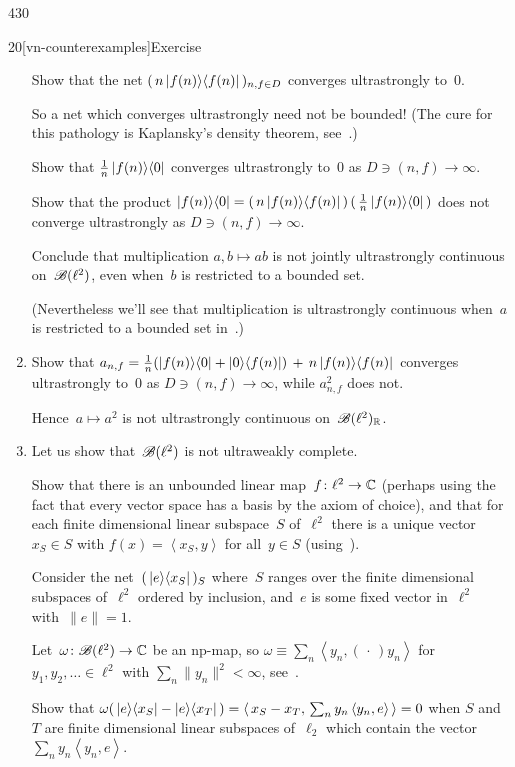 \begin{parsec}{430}
\begin{point}{20}[vn-counterexamples]{Exercise}
\begin{enumerate}
Show that the net $(\, n\ketbra{f(n)}{f(n)}\,)_{n,f\in D}$
converges ultrastrongly to~$0$.

So a net which converges ultrastrongly need not be bounded!
(The cure for this pathology is Kaplansky's density theorem, 
see~.)

Show that $\frac{1}{n} \ketbra{f(n)}{0}$
converges ultrastrongly to~$0$ as $D\ni(n,f)\to \infty$.

Show that the product
$\ketbra{f(n)}{0} = (\,n\ketbra{f(n)}{f(n)}\,)\,(\,\frac{1}{n}
\ketbra{f(n)}{0}\,)$
does not converge ultrastrongly 
as $D\ni(n,f)\to\infty$.

Conclude that multiplication $a,b\mapsto ab$
is not jointly ultrastrongly continuous on~$\scrB(\ell^2)$,
even when~$b$ is restricted to a bounded set.

(Nevertheless we'll see that multiplication is ultrastrongly continuous
when~$a$ is restricted to a bounded set in~.)

\item
Show that
$a_{n,f} = \frac{1}{n}(\left|f(n)\right>\!\left<0\right|+\left|0\right>\!\left<f(n)\right|)
\,+\, n\left|f(n)\right>\!\left<f(n)\right|$
converges ultrastrongly to~$0$
as $D\ni(n,f)\to\infty$,
while $a_{n,f}^2$ does not.

Hence~$a\mapsto a^2$ is not ultrastrongly continuous on~$\mathscr{B}(\ell^2)_{\mathbb{R}}$.

\item
Let us show that~$\scrB(\ell^2)$
is not ultraweakly complete.

Show that there is an unbounded linear map~$f\colon \ell^2\to\mathbb{C}$
(perhaps using the fact that every vector space
has a basis by the axiom of choice),
and that for each finite dimensional linear subspace~$S$ of~$\ell^2$
there is a unique vector~$x_S\in S$ 
with
$f(x)=\left<x_S,y\right>$ for all~$y\in S$
(using~).

Consider the net~$(\,\left|e\right>\!\left<x_S\right|\,)_S$
where~$S$ ranges over the finite dimensional subspaces of~$\ell^2$
ordered by inclusion,
and~$e$ is some fixed vector in~$\ell^2$ with~$\|e\|=1$.

Let~$\omega\colon \mathscr{B}(\ell^2)\to\mathbb{C}$
be an np-map,
so $\omega\equiv \sum_n \left<y_n,(\,\cdot\,)y_n\right>$
for $y_1,y_2,\dotsc \in \ell^2$ with $\sum_n \|y_n\|^2 <\infty$,
see~.

Show that $\omega(\,\left|e\right>\!\left<x_S\right|-\left|e\right>\!\left<x_T\right|\,)
= \left<\,x_S-x_T,\,\sum_n y_n\left<y_n,e\right>\,\right> = 0$
when $S$ and~$T$ are finite dimensional linear subspaces of~$\ell_2$
which contain the vector $\sum_n y_n\left<y_n,e\right>$.


\end{enumerate}
\end{point}
\end{parsec}
